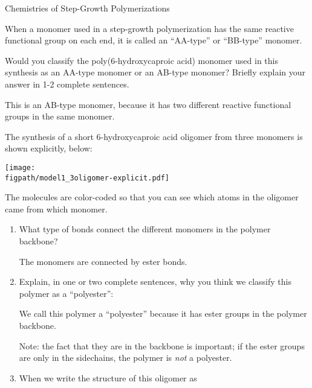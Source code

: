 \begin{activity}{Chemistries of Step-Growth Polymerizations}
\begin{infobox}
	When a monomer used in a step-growth polymerization has the same reactive functional group on each end, it is called an ``AA-type'' or ``BB-type'' monomer.

\end{infobox}

\begin{ctqs}
		
		\question Would you classify the poly(6-hydroxycaproic acid) monomer used in this synthesis as an AA-type monomer or an AB-type monomer?  Briefly explain your answer in 1-2 complete sentences.
			
				\begin{solution}[1.75in]
					This is an AB-type monomer, because it has two different reactive functional groups in the same monomer.
				\end{solution}
		
		\question The synthesis of a short 6-hydroxycaproic acid oligomer from three monomers is shown explicitly, below: \label{\labelbase:ctq:6hcpa-oligomer}
	
\vspace{0.25in}	\centerline{\texttt{[image: \\figpath/model1\_3oligomer-explicit.pdf]}}
The molecules are color-coded so that you can see which atoms in the oligomer came from which monomer.
		
		\begin{enumerate}
		
			\item What type of bonds connect the different monomers in the polymer backbone?
			
				\begin{solution}[1.5in]
					The monomers are connected by ester bonds.
				\end{solution}
		
			\item Explain, in one or two complete sentences, why you think we classify this polymer as a ``polyester'':
			
				\begin{solution}[2in]
					We call this polymer a ``polyester'' because it has ester groups in the polymer backbone.
					
					Note: the fact that they are in the backbone is important; if the ester groups are only in the sidechains, the polymer is \emph{not} a polyester.
				\end{solution}
	
			\item When we write the structure of this oligomer as
	

\end{enumerate}
\end{ctqs}
\end{activity}
